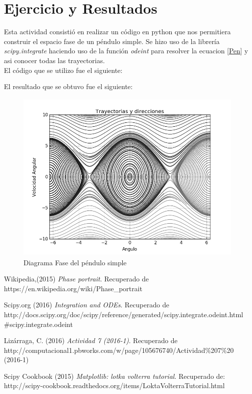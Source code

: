 \documentclass[12pt]{article}
\begin{document}
\section{Ejercicio y Resultados}
Esta actividad consistió en realizar un código en python que nos permitiera construir el espacio fase de un péndulo simple. Se hizo uso de la librería \emph{scipy.integrate} haciendo uso de la función \textit{odeint} para resolver la ecuacion \eqref{Pen} y asi conocer todas las trayectorias. \\

El código que se utilizo fue el siguiente:


El resultado que se obtuvo fue el siguiente:
\begin{figure}[H]
\centering
\includegraphics[width=15cm, height=8.5cm]{DFase.png}
\caption{Diagrama Fase del péndulo simple}
\end{figure}

\pagebreak

\begin{thebibliography}{4}

	Wikipedia,(2015)
	\emph{Phase portrait}. Recuperado de\\
	https://en.wikipedia.org/wiki/Phase\_portrait

	Scipy.org (2016)
	\emph{Integration and ODEs}. Recuperado de\\
	http://docs.scipy.org/doc/scipy/reference/generated/scipy.integrate.odeint.html\\\#scipy.integrate.odeint

	Lizárraga, C. (2016)
	\emph{Actividad 7 (2016-1)}. Recuperado de\\ 
	http://computacional1.pbworks.com/w/page/105676740/Actividad\%207\%20\\(2016-1)
	
	Scipy Cookbook (2015)
	\emph{Matplotlib: lotka volterra tutorial}. Recuperado de:\\
	http://scipy-cookbook.readthedocs.org/items/LoktaVolterraTutorial.html	
		
\end{thebibliography}
\end{document}
